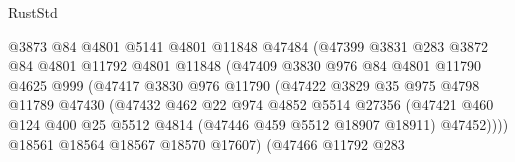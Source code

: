 \begin{lexlean}{RustStd}
\begin{coremodule}
                                @3873
                                @84
                                @4801
                                @5141
                                @4801
                                @11848
                                @47484
                                (@47399
                                  @3831
                                  @283
                                  @3872
                                  @84
                                  @4801
                                  @11792
                                  @4801
                                  @11848
                                  (@47409
                                    @3830
                                    @976
                                    @84
                                    @4801
                                    @11790
                                    @4625
                                    @999
                                    (@47417
                                      @3830
                                      @976
                                      @11790
                                      (@47422
                                        @3829
                                        @35
                                        @975
                                        @4798
                                        @11789
                                        @47430
                                        (@47432
                                          @462
                                          @22
                                          @974
                                          @4852
                                          @5514
                                          @27356
                                          (@47421
                                            @460
                                            @124
                                            @400
                                            @25
                                            @5512
                                            @4814
                                            (@47446 @459 @5512 @18907 @18911)
                                            @47452))))
                                    @18561
                                    @18564
                                    @18567
                                    @18570
                                    @17607)
                                  (@47466
                                    @11792
                                    @283

\end{coremodule}
\end{lexlean}
